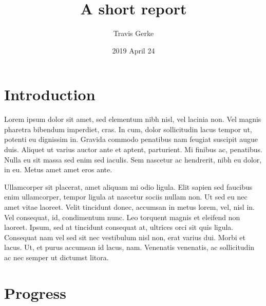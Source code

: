 \documentclass[]{article}
\title{A short report}
\author{Travis Gerke}
\date{2019 April 24}
\begin{document}
\makeatletter
\renewcommand{\maketitle}{\bgroup\vspace*{-2cm}\setlength{\parindent}{0pt}
\begin{flushleft}
  \textbf{\@title}
  
  \@author
  
  \@date
  
\end{flushleft}\egroup
}
\makeatother
\maketitle

\hypertarget{introduction}{%
\section{Introduction}\label{introduction}}

Lorem ipsum dolor sit amet, sed elementum nibh nisl, vel lacinia non.
Vel magnis pharetra bibendum imperdiet, cras. In cum, dolor sollicitudin
lacus tempor ut, potenti eu dignissim in. Gravida commodo penatibus nam
feugiat suscipit augue duis. Aliquet ut varius auctor ante et aptent,
parturient. Mi finibus ac, penatibus. Nulla eu sit massa sed enim sed
iaculis. Sem nascetur ac hendrerit, nibh eu dolor, in eu. Metus amet
amet eros ante.

Ullamcorper sit placerat, amet aliquam mi odio ligula. Elit sapien sed
faucibus enim ullamcorper, tempor ligula at nascetur sociis nullam non.
Ut sed eu nec amet vitae laoreet. Velit tincidunt donec, accumsan in
metus lorem, vel, nisl in. Vel consequat, id, condimentum nunc. Leo
torquent magnis et eleifend non laoreet. Ipsum, sed at tincidunt
consequat at, ultrices orci sit quis ligula. Consequat nam vel sed sit
nec vestibulum nisl non, erat varius dui. Morbi et lacus. Ut, et purus
accumsan id lacus, nam. Venenatis venenatis, ac sollicitudin ac nec
semper ut dictumst litora.

\hypertarget{progress}{%
\section{Progress}\label{progress}}
\end{document}

